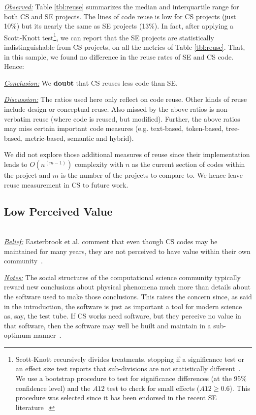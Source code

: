 \documentclass[sigconf]{acmart}
\newenvironment{RQ}{\vspace{1mm}\begin{tcolorbox}[enhanced,width=3.4in,size=fbox,colback=red!5!white,drop shadow southeast,sharp corners]}{\end{tcolorbox}}
\begin{document}
\noindent \textit{\underline{Observed:}} Table \ref{tbl:reuse} summarizes the median and interquartile range for both CS and SE projects. The lines of code reuse is low for CS projects (just 10\%) but its nearly the same as SE projects (13\%). In fact,
after applying a Scott-Knott test\footnote{
Scott-Knott recursively divides treatments, stopping if
a significance test or an effect size test reports that sub-divisions are
not statistically different~\cite{mittas2013ranking, ghotra15}.
We use a bootstrap procedure to test for significance differences (at the 95\% confidence level) 
and the $\mathit{A12}$ test to check for small effects ($\mathit{A12} \ge 0.6$).
This procedure was selected
since it has been endorsed in the recent SE literature~\cite{mittas2013ranking,arcuri2011practical}.}, 
we can report that the SE projects are statistically
indistinguishable from CS projects, on all the metrics of Table \ref{tbl:reuse}. 
That, in this sample, we found no difference in the reuse rates
of SE and CS code. Hence: 
\begin{RQ} 
\textit{\underline{Conclusion:}} We \textbf{doubt} that CS reuses less code  than SE. 
\end{RQ}

\noindent \textit{\underline{Discussion:}} 
The ratios used here only reflect on code reuse.
Other kinds of reuse include design or conceptual reuse. 
Also missed by the above ratios is non-verbatim reuse (where code is reused, but modified).
Further, the above ratios may miss certain important code measures
(e.g. text-based, token-based, tree-based, metric-based, semantic and hybrid).

We did not explore those additional measures of reuse since
their implementation leads to $O(n^{(m-1)})$ complexity with $n$ as the current section of codes within the project and $m$ is the number of the projects to compare to. We hence leave reuse measurement in CS to  future work.

\subsection{Low Perceived Value} ~\\
\noindent \textit{\underline{Belief:}} 
Easterbrook et al. comment that even though CS codes
may be maintained for many years,
they are not perceived to have value within their own community~\cite{faulk09_secs, segal07_enduser, easterbrook_cs, boyle09_lessons}.

\noindent \textit{\underline{Notes:}} The social structures of the computational science community
typically reward new conclusions about physical phenomena much more than
details about the software used
to make those conclusions. This raises the concern since, as said in the introduction, the software is just as important a tool for modern science as, say, the test tube. If CS works need software,
but they perceive no value in that software, then the software may well be built and maintain in a sub-optimum manner~\cite{sanders08_risk}. 
\end{document}
